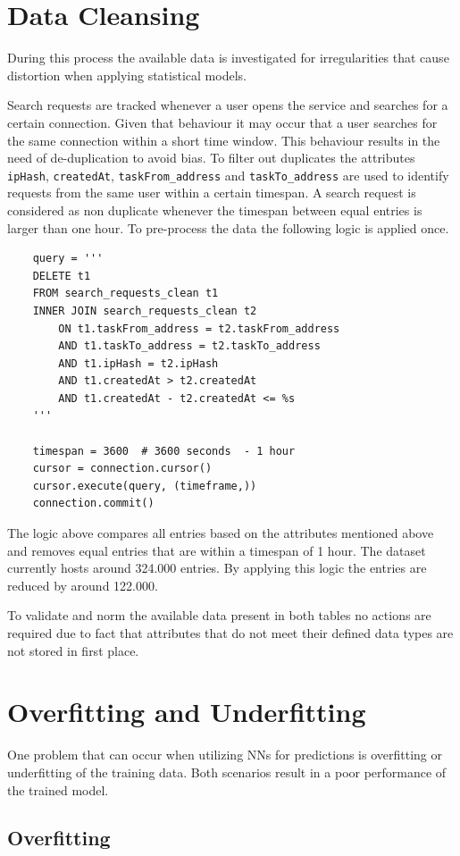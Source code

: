 \section{Data Cleansing}
\label{sec:data_cleansing}
During this process the available data is investigated for irregularities that cause distortion when applying statistical models. 

Search requests are tracked whenever a user opens the service and searches for a certain connection. Given that behaviour it may occur that a user searches for the same connection within a short time window. This behaviour results in the need of de-duplication to avoid bias. To filter out duplicates the attributes \verb|ipHash|, \verb|createdAt|, \verb|taskFrom_address| and \verb|taskTo_address| are used to identify requests from the same user within a certain timespan. A search request is considered as non duplicate whenever the timespan between equal entries is larger than one hour. 
To pre-process the data the following logic is applied once.
\begin{lstlisting}
    query = '''
    DELETE t1
    FROM search_requests_clean t1
    INNER JOIN search_requests_clean t2
        ON t1.taskFrom_address = t2.taskFrom_address
        AND t1.taskTo_address = t2.taskTo_address
        AND t1.ipHash = t2.ipHash
        AND t1.createdAt > t2.createdAt
        AND t1.createdAt - t2.createdAt <= %s
	'''

    timespan = 3600  # 3600 seconds  - 1 hour
    cursor = connection.cursor()
    cursor.execute(query, (timeframe,))
    connection.commit()
\end{lstlisting}
The logic above compares all entries based on the attributes mentioned above and removes equal entries that are within a timespan of 1 hour. The dataset currently hosts around 324.000 entries. By applying this logic the entries are reduced by around 122.000. 

To validate and norm the available data present in both tables no actions are required due to fact that attributes that do not meet their defined data types are not stored in first place. 

\section{Overfitting and Underfitting}
One problem that can occur when utilizing NNs for predictions is overfitting or underfitting of the training data. Both scenarios result in a poor performance of the trained model. \cite{fitting} 
\subsection{Overfitting}

